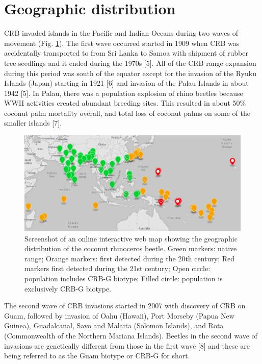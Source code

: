 \documentclass[twocolumn,letterpaper]{scrartcl}
\begin{document}
\section{Geographic distribution}

CRB invaded islands in the Pacific and Indian Oceans during two waves of movement (Fig. \ref{fig:crbdist}). The first wave occurred started in 1909 when CRB was accidentally transported to from Sri Lanka to Samoa with shipment of rubber tree seedlings and it ended during the 1970s
[5]. All of the CRB range expansion during this period was south of the equator except for the invasion of the Ryuku Islands (Japan) starting in 1921 [6] and invasion of the Palau Islands in about 1942 [5]. In Palau, there was a population explosion of rhino beetles because WWII activities created abundant breeding sites. This resulted in about 50\% coconut palm mortality overall, and total loss of coconut palms on some of the smaller islands [7].

\begin{figure}
	\centering
	\includegraphics[width=\linewidth]{images/crb_dist}
	\caption{Screenshot of an online interactive web map \cite{moore_web_2019} showing the geographic distribution of the coconut rhinoceros beetle. Green markers: native range; Orange markers: first detected during the 20th century; Red markers first detected during the 21st century; Open circle: population includes CRB-G biotype; Filled circle: population is exclusively CRB-G biotype.}
	\label{fig:crbdist}
\end{figure}

The second wave of CRB invasions started in 2007 with discovery of CRB on Guam, followed by invasion of Oahu (Hawaii), Port Morseby (Papua New Guinea), Guadalcanal, Savo and Malaita (Solomon Islands), and Rota (Commonwealth of the Northern Mariana Islands). Beetles in the second wave of invasions are genetically different from those in the first wave [8] and these are being referred to as the Guam biotype or CRB-G for short.
\end{document}

